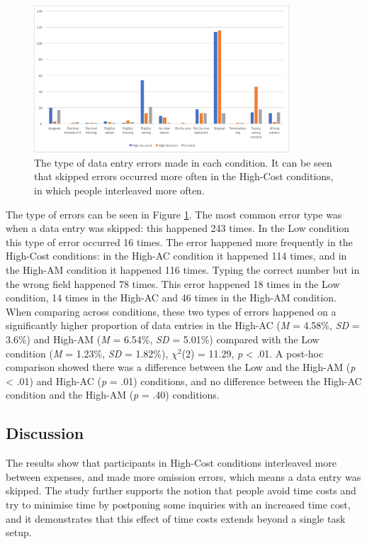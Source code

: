 \begin{figure}
\includegraphics[width=0.85\textwidth]{images/ch34/ch34-5_TypeofErrors.pdf}
    \caption[Study 5 type of data entry errors]{The type of data entry errors made in each condition. It can be seen that skipped errors occurred more often in the High-Cost conditions, in which people interleaved more often.}\label{fig:ch34_5-typeoferrors}
\end{figure}

The type of errors can be seen in Figure \ref{fig:ch34_5-typeoferrors}. The most common error type was when a data entry was skipped: this happened 243 times. %
In the Low condition this type of error occurred 16 times. The error happened more frequently in the High-Cost conditions: in the High-AC condition it happened 114 times, and in the High-AM condition it happened 116 times.
Typing the correct number but in the wrong field happened 78 times. This error happened 18 times in the Low condition, 14 times in the High-AC and 46 times in the High-AM condition.
When comparing across conditions, these two types of errors happened on a significantly higher proportion of data entries in the High-AC (\textit{M} = 4.58\%, \textit{SD} = 3.6\%) and High-AM (\textit{M} = 6.54\%, \textit{SD} = 5.01\%) compared with the Low condition (\textit{M} = 1.23\%, \textit{SD} = 1.82\%),  $\chi^2$(2) = 11.29, \textit{p} < .01.  A post-hoc comparison showed there was a difference between the Low and the High-AM (\textit{p} < .01) and High-AC (\textit{p} = .01) conditions, and no difference between the High-AC condition and the High-AM (\textit{p} = .40) conditions.


\subsection{Discussion}
The results show that participants in High-Cost conditions interleaved more between expenses, and made more omission errors, which means a data entry was skipped. The study further supports the notion that people avoid time costs and try to minimise time by postponing some inquiries with an increased time cost, and it demonstrates that this effect of time costs extends beyond a single task setup.

